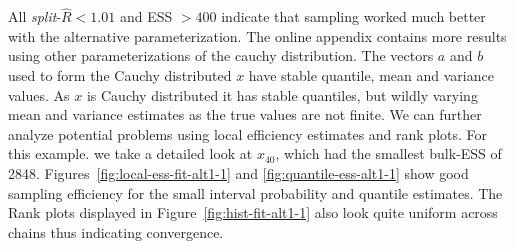 \documentclass[american,]{article}
\begin{document}

All \emph{split}-\(\widehat{R}<1.01\) and ESS \(>400\) indicate that
sampling worked much better with the alternative parameterization.
The online appendix contains more results using other parameterizations 
of the cauchy distribution. The vectors \(a\) and \(b\) used
to form the Cauchy distributed \(x\) have stable quantile, mean and
variance values. As \(x\) is Cauchy distributed it has stable
quantiles, but wildly varying mean and variance estimates as the true values
are not finite.
%
We can further analyze potential problems using local efficiency
estimates and rank plots. For this example. we take a detailed look at 
\(x_{40}\), which had the smallest bulk-ESS of 2848.
%
Figures~\ref{fig:local-ess-fit-alt1-1} and
\ref{fig:quantile-ess-alt1-1} show good sampling efficiency for the
small interval probability and quantile estimates.
%
The Rank plots displayed in Figure~\ref{fig:hist-fit-alt1-1} also look quite 
uniform across chains thus indicating convergence.
\end{document}
